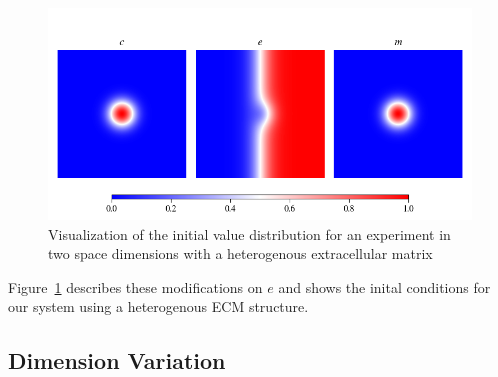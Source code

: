 \begin{figure}[h]
    \centering
    \label{fig:Initial_Value_Distribution}
    \includegraphics[width=\textwidth]{resources/images/2D_initial_conditions_heterogenous_ECM.png}
    \caption{Visualization of the initial value distribution for an experiment in two space dimensions with a heterogenous extracellular matrix}
    \label{fig:2D_heterogenous_ECM_initial}
\end{figure}
Figure~\ref{fig:2D_heterogenous_ECM_initial} describes these modifications on $e$ and shows the inital conditions for our system using a heterogenous ECM structure.
  


\subsection{Dimension Variation}

